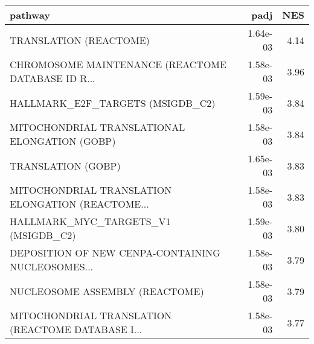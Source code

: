 \begin{tabular}{lrr}
\toprule
                                           pathway &      padj &   NES \\
\midrule
                            TRANSLATION (REACTOME) &  1.64e-03 &  4.14 \\
 CHROMOSOME MAINTENANCE (REACTOME DATABASE ID R... &  1.58e-03 &  3.96 \\
                  HALLMARK\_E2F\_TARGETS (MSIGDB\_C2) &  1.59e-03 &  3.84 \\
     MITOCHONDRIAL TRANSLATIONAL ELONGATION (GOBP) &  1.58e-03 &  3.84 \\
                                TRANSLATION (GOBP) &  1.65e-03 &  3.83 \\
 MITOCHONDRIAL TRANSLATION ELONGATION (REACTOME... &  1.58e-03 &  3.83 \\
               HALLMARK\_MYC\_TARGETS\_V1 (MSIGDB\_C2) &  1.59e-03 &  3.80 \\
 DEPOSITION OF NEW CENPA-CONTAINING NUCLEOSOMES... &  1.58e-03 &  3.79 \\
                    NUCLEOSOME ASSEMBLY (REACTOME) &  1.58e-03 &  3.79 \\
 MITOCHONDRIAL TRANSLATION (REACTOME DATABASE I... &  1.58e-03 &  3.77 \\
\bottomrule
\end{tabular}
